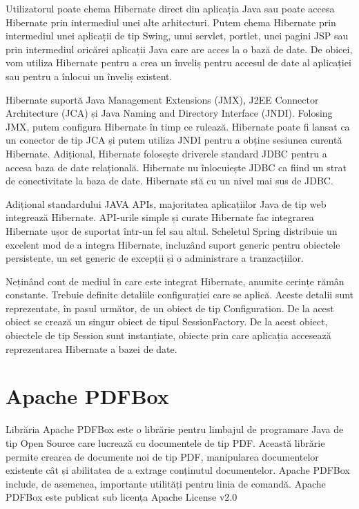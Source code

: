 \documentclass[12pt]{book}
\begin{document}
Utilizatorul poate chema Hibernate direct din aplicația Java sau poate accesa Hibernate prin intermediul unei alte arhitecturi. Putem chema Hibernate prin intermediul unei aplicații de tip Swing, unui servlet, portlet, unei pagini JSP sau prin intermediul oricărei aplicații Java care are acces la o bază de date. De obicei, vom utiliza Hibernate pentru a crea un înveliș pentru accesul de date al aplicației sau pentru a înlocui un înveliș existent.

Hibernate suportă Java Management Extensions (JMX), J2EE Connector Architecture (JCA) și Java Naming and Directory Interface (JNDI). Folosing JMX, putem configura Hibernate în timp ce rulează. Hibernate poate fi lansat ca un conector de tip JCA și putem utiliza JNDI pentru a obține sesiunea curentă Hibernate. Adițional, Hibernate folosește driverele standard JDBC pentru a accesa baza de date relațională. Hibernate nu înlocuiește JDBC ca fiind un strat de conectivitate la baza de date. Hibernate stă cu un nivel mai sus de JDBC. 

Adițional standardului JAVA APIs, majoritatea aplicațiilor Java de tip web integrează Hibernate. API-urile simple și curate Hibernate fac integrarea Hibernate ușor de suportat într-un fel sau altul. Scheletul Spring distribuie un excelent mod de a integra Hibernate, incluzând suport generic pentru obiectele persistente, un set generic de excepții și o administrare a tranzacțiilor.

Neținând cont de mediul în care este integrat Hibernate, anumite cerințe rămân constante. Trebuie definite detaliile configurației care se aplică. Aceste detalii sunt reprezentate, în pasul următor, de un obiect de tip Configuration. De la acest obiect se crează un singur obiect de tipul SessionFactory. De la acest obiect, obiectele de tip Session sunt instanțiate, obiecte prin care aplicația accesează reprezentarea Hibernate a bazei de date. 

\section{Apache PDFBox}

Librăria Apache PDFBox este o librărie pentru limbajul de programare Java de tip Open Source care lucrează cu documentele de tip PDF. Această librărie permite crearea de documente noi de tip PDF, manipularea documentelor existente cât și abilitatea de a extrage conținutul documentelor. Apache PDFBox include, de asemenea, importante utilități pentru linia de comandă. Apache PDFBox este publicat sub licența Apache License v2.0
\end{document}
